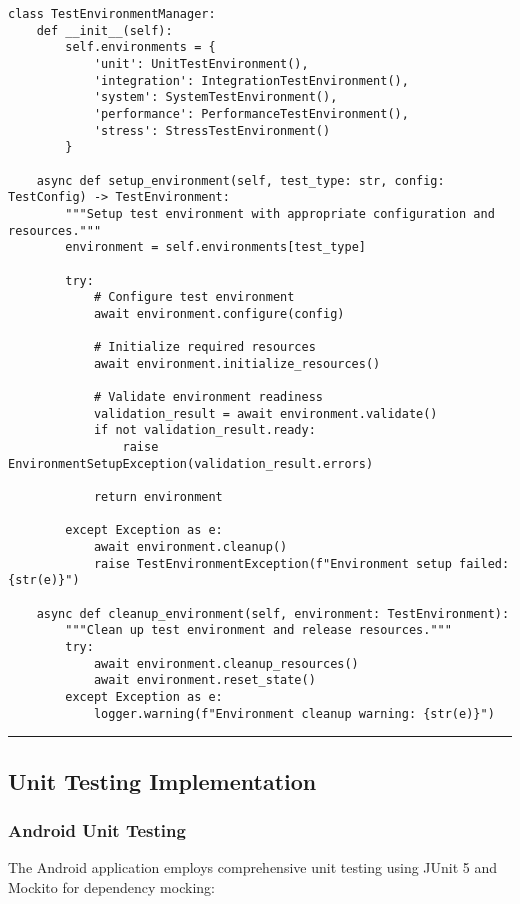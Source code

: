 \documentclass[11pt,a4paper]{report}
\begin{document}
\begin{verbatim}
class TestEnvironmentManager:
    def __init__(self):
        self.environments = {
            'unit': UnitTestEnvironment(),
            'integration': IntegrationTestEnvironment(),
            'system': SystemTestEnvironment(),
            'performance': PerformanceTestEnvironment(),
            'stress': StressTestEnvironment()
        }

    async def setup_environment(self, test_type: str, config: TestConfig) -> TestEnvironment:
        """Setup test environment with appropriate configuration and resources."""
        environment = self.environments[test_type]

        try:
            # Configure test environment
            await environment.configure(config)

            # Initialize required resources
            await environment.initialize_resources()

            # Validate environment readiness
            validation_result = await environment.validate()
            if not validation_result.ready:
                raise EnvironmentSetupException(validation_result.errors)

            return environment

        except Exception as e:
            await environment.cleanup()
            raise TestEnvironmentException(f"Environment setup failed: {str(e)}")

    async def cleanup_environment(self, environment: TestEnvironment):
        """Clean up test environment and release resources."""
        try:
            await environment.cleanup_resources()
            await environment.reset_state()
        except Exception as e:
            logger.warning(f"Environment cleanup warning: {str(e)}")
\end{verbatim}

\hrule

\subsection{Unit Testing Implementation}

\subsubsection{Android Unit Testing}

The Android application employs comprehensive unit testing using JUnit 5 and Mockito for dependency mocking:
\end{document}
